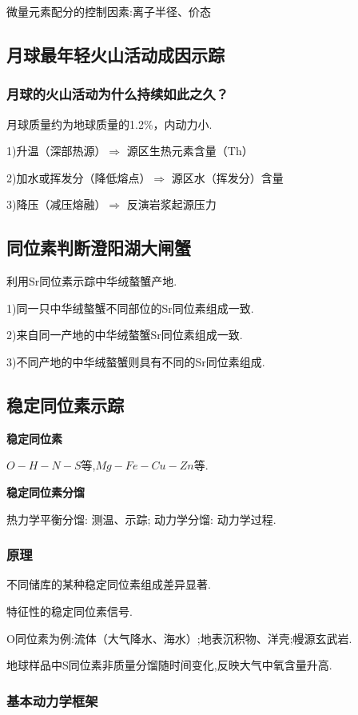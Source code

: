 \documentclass[12pt,a4paper]{article}
\begin{document}
	微量元素配分的控制因素:离子半径、价态
	
	\subsection{月球最年轻火山活动成因示踪}
	
	\subsubsection{月球的火山活动为什么持续如此之久？}
	月球质量约为地球质量的1.2\%，内动力小.
	
	1)升温（深部热源）$\Rightarrow$ 源区生热元素含量（Th）
	
	2)加水或挥发分（降低熔点）$\Rightarrow$ 源区水（挥发分）含量
	
	3)降压（减压熔融）$\Rightarrow$ 反演岩浆起源压力
	
	\subsection{同位素判断澄阳湖大闸蟹}
	
	利用Sr同位素示踪中华绒螯蟹产地.
	
	1)同一只中华绒螯蟹不同部位的Sr同位素组成一致.
	
	2)来自同一产地的中华绒螯蟹Sr同位素组成一致.
	
	3)不同产地的中华绒螯蟹则具有不同的Sr同位素组成.
	
	\subsection{稳定同位素示踪}
	
	\textbf{稳定同位素}
	
	$O-H-N-S$等,$Mg-Fe-Cu-Zn$等.
	
	\textbf{稳定同位素分馏}
	
	热力学平衡分馏: 测温、示踪; 动力学分馏: 动力学过程.
	\subsubsection{原理}
	不同储库的某种稳定同位素组成差异显著.
	
	特征性的稳定同位素信号.
	
	O同位素为例:流体（大气降水、海水）;地表沉积物、洋壳;幔源玄武岩.
	
	地球样品中S同位素非质量分馏随时间变化,反映大气中氧含量升高.
	
	\subsubsection{基本动力学框架}
	
\end{document}
